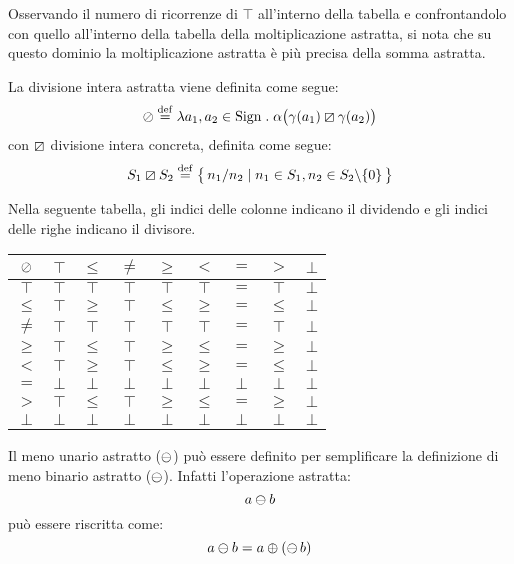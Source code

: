 Osservando il numero di ricorrenze di $\top$ all'interno della tabella
e confrontandolo con quello all'interno della tabella
della moltiplicazione astratta, si nota che su questo dominio
la moltiplicazione astratta è più precisa della somma astratta.

\begin{definizione}
La divisione intera astratta viene definita come segue:
\[
  \absdiv \defeq \lambda a_1,a_2 \in \Sign \st \alpha\bigl(\gamma(a_1) \condiv \gamma(a_2)\bigr)
\]
con $\mathbin{\boxslash}$ divisione intera concreta, definita come segue:
\[
  S_1 \condiv S_2 \defeq \bigl\{\, n_1 / n_2 \mid n_1 \in S_1, n_2 \in S_2 \backslash \{0\} \,\bigr\}
\]
\end{definizione}
Nella seguente tabella, gli indici delle colonne indicano il dividendo e gli indici delle righe indicano il divisore.
\begin{center}
  \begin{tabular}{c | c c c c c c c c }
    $\mathbin{\oslash}$ & $\top$ & $\leq$ & $\neq$ & $\geq$ & $<$ & $=$ & $>$ & $\bot$ \\
    \hline
    $\top$ & $\top$ & $\top$ & $\top$ & $\top$ & $\top$ & $=$ & $\top$ & $\bot$\\
    $\leq$ & $\top$ & $\geq$ & $\top$ & $\leq$ & $\geq$ & $=$ & $\leq$ & $\bot$\\
    $\neq$ & $\top$ & $\top$ & $\top$ & $\top$ & $\top$ & $=$ & $\top$ & $\bot$\\
    $\geq$ & $\top$ & $\leq$ & $\top$ & $\geq$ & $\leq$ & $=$ & $\geq$ & $\bot$\\
    $<$ & $\top$ & $\geq$ & $\top$ & $\leq$ & $\geq$ & $=$ & $\leq$ & $\bot$\\
    $=$ & $\bot$ & $\bot$ & $\bot$ & $\bot$ & $\bot$ & $\bot$ & $\bot$ & $\bot$\\
    $>$ & $\top$ & $\leq$ & $\top$ & $\geq$ & $\leq$ & $=$ & $\geq$ & $\bot$\\
    $\bot$ & $\bot$ & $\bot$ & $\bot$ & $\bot$ & $\bot$ & $\bot$ & $\bot$ & $\bot$
  \end{tabular}
\end{center}

\begin{definizione}
Il meno unario astratto ($\mathop{\ominus}\nolimits$) può essere definito
per semplificare la definizione di meno binario astratto ($\mathbin{\ominus}$).
Infatti l'operazione astratta:
\[
  a \mathbin{\ominus} b
\]
può essere riscritta come:
\[
  a  \mathbin{\ominus} b = a \mathbin{\oplus} (\mathop{\ominus}\nolimits b)
\]
\end{definizione}

